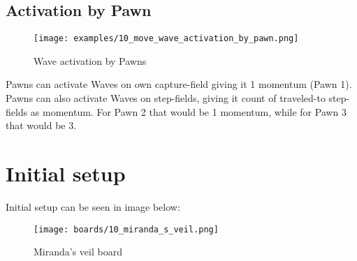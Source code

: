 \clearpage %

\subsection*{Activation by Pawn}

\noindent
\begin{figure}[!h]
\texttt{[image: examples/10\_move\_wave\_activation\_by\_pawn.png]}
\caption{Wave activation by Pawns}
\label{fig:10_move_wave_activation_by_pawn}
\end{figure}

Pawns can activate Waves on own capture-field giving it 1 momentum (Pawn 1).
Pawns can also activate Waves on step-fields, giving it count of traveled-to
step-fields as momentum. For Pawn 2 that would be 1 momentum, while for Pawn 3
that would be 3.

\clearpage %

\section*{Initial setup}

Initial setup can be seen in image below:

\noindent
\begin{figure}[h]
\texttt{[image: boards/10\_miranda\_s\_veil.png]}
\caption{Miranda's veil board}
\label{fig:10_miranda_s_veil}
\end{figure}

\clearpage %
